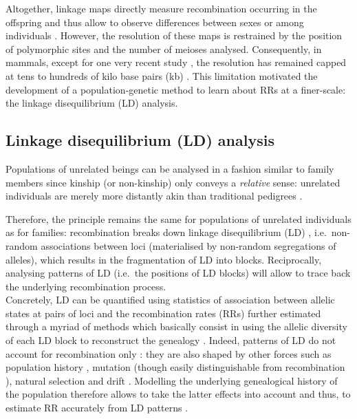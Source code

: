 Altogether, linkage maps directly measure recombination occurring in the offspring and thus allow to observe differences between sexes \citep[e.g.][]{cheung2007polymorphic,coop2008highresolution} or among individuals \citep[e.g.][]{broman1998comprehensive}.
However, the resolution of these maps is restrained by the position of polymorphic sites and the number of meioses analysed. 
Consequently, in mammals, except for one very recent study \citep{halldorsson2019characterizing}, the resolution has remained capped at tens to hundreds of kilo base pairs (kb) \citep{shifman2006highresolution,billings2010patterns,kong2010finescale}.
This limitation motivated the development of a population-genetic method to learn about RRs at a finer-scale: the linkage disequilibrium (LD) analysis.


\subsection{Linkage disequilibrium (LD) analysis}%
\label{chap3:LD}

Populations of unrelated beings can be analysed in a fashion similar to family members since kinship (or non-kinship) only conveys a \textit{relative} sense: unrelated individuals are merely more distantly akin than traditional pedigrees \citep{nordborg2002linkage}.

Therefore, the principle remains the same for populations of unrelated individuals as for families: recombination breaks down linkage disequilibrium (LD) \citep{lewontin1960evolutionary}, i.e.\ non-random associations between loci (materialised by non-random segregations of alleles), which results in the fragmentation of LD into blocks.
Reciprocally, analysing patterns of LD (i.e.\ the positions of LD blocks) will allow to trace back the underlying recombination process.\\

Concretely, LD can be quantified using statistics of association between allelic states at pairs of loci \citep{lewontin1964interaction,hill1968linkage} and the recombination rates (RRs) further estimated through a myriad of methods \citep[reviewed in][]{stumpf2003estimating} which basically consist in using the allelic diversity of each LD block to reconstruct the genealogy \citep[reviewed in][]{hinch2013landscape}.
Indeed, patterns of LD do not account for recombination only \citep[reviewed in][]{venn2013inferring}: they are also shaped by other forces such as population history \citep{golding1984sampling}, mutation \citep{calafell2001haplotype} (though easily distinguishable from recombination \citep{hudson1985statistical}), natural selection \citep{barton2000genetic} and drift \citep{charlesworth1997effects}. 
Modelling the underlying genealogical history of the population therefore allows to take the latter effects into account and thus, to estimate RR accurately from LD patterns \citep{stumpf2003estimating}.\\

